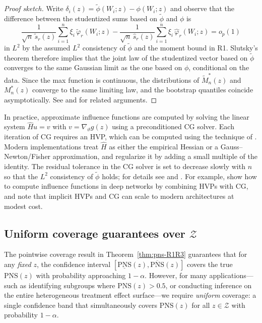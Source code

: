 \documentclass[accepted]{uai2026} %
\theoremstyle{plain}
\theoremstyle{definition}
\theoremstyle{remark}
\begin{document}
\begin{proof}[Proof sketch]
Write $\delta_i(z)=\tilde\phi(W_i;z)-\phi(W_i;z)$ and observe that the
difference between the studentized sums based on $\tilde\phi$ and $\phi$ is
\begin{equation}
\label{eq:slutsky-diff}
    \frac{1}{\sqrt{n}\,\tilde s_r(z)}\sum_{i=1}^n \xi_i\,\tilde\varphi_r(W_i;z)
  - \frac{1}{\sqrt{n}\,\hat s_r(z)}\sum_{i=1}^n \xi_i\,\hat\varphi_r(W_i;z)
  = o_p(1)  
\end{equation}
in $L^2$ by the assumed $L^2$ consistency of $\tilde\phi$ and the moment
bound in R1.  Slutsky's theorem therefore implies that the joint law of the
studentized vector based on $\tilde\phi$ converges to the same Gaussian
limit as the one based on $\phi$, conditional on the data.  Since the max
function is continuous, the distributions of $\tilde M_n^*(z)$ and
$M_n^*(z)$ converge to the same limiting law, and the bootstrap quantiles
coincide asymptotically.  See \citep[Sec.~23]{vandervaart1998asymptotic} and
\citep[Lem.~3.1]{chernozhukov2013gaussian} for related arguments.
\end{proof}

In practice, approximate influence functions are computed by solving the
linear system $\hat H u = v$ with $v = \nabla_\vartheta g(z)$ using a
preconditioned CG solver.  Each iteration of CG requires an HVP, which can
be computed using the technique of \citep{pearlmutter1994}.  Modern
implementations treat $\hat H$ as either the empirical Hessian or a
Gauss--Newton/Fisher approximation, and regularize it by adding a small
multiple of the identity.  The residual tolerance in the CG solver is set to
decrease slowly with $n$ so that the $L^2$ consistency of $\tilde\phi$ holds;
for details see \citep{martens2010} and \citep{kohliang2017}.  For example,
\citep{kohliang2017} show how to compute influence functions in deep
networks by combining HVPs with CG, and note that implicit HVPs and CG can
scale to modern architectures at modest cost.  

\subsection{Uniform coverage guarantees over $\mathcal{Z}$}
\label{subsec:uniform}

The pointwise coverage result in Theorem~\ref{thm:pns-R1R3} guarantees that
for any \emph{fixed} $z$, the confidence interval
$[\underline{\mathrm{PNS}}(z), \overline{\mathrm{PNS}}(z)]$ covers the true
$\mathrm{PNS}(z)$ with probability approaching $1-\alpha$. However, for many
applications---such as identifying subgroups where $\mathrm{PNS}(z) > 0.5$,
or conducting inference on the entire heterogeneous treatment effect
surface---we require \emph{uniform} coverage: a single confidence band that
simultaneously covers $\mathrm{PNS}(z)$ for all $z \in \mathcal{Z}$ with
probability $1-\alpha$.
\end{document}
